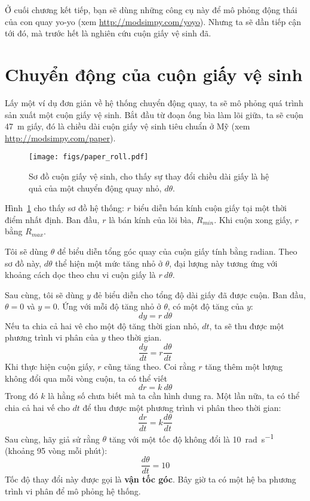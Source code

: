 \documentclass[12pt, openany]{book}
\theoremstyle{exercise}
\begin{document}
Ở cuối chương kết tiếp, bạn sẽ dùng những công cụ này để mô phỏng động thái của con quay yo-yo (xem \url{http://modsimpy.com/yoyo}).  Nhưng ta sẽ dần tiếp cận tới đó, mà trước hết là nghiên cứu cuộn giấy vệ sinh đã.



\section{Chuyển động của cuộn giấy vệ sinh}
\label{paper}


Lấy một ví dụ đơn giản về hệ thống chuyển động quay, ta sẽ mô phỏng quá trình sản xuất một cuộn giấy vệ sinh. Bắt đầu từ đoạn ống bìa làm lõi giữa, ta sẽ cuộn \SI{47}{\meter} giấy, đó là chiều dài cuộn giấy vệ sinh tiêu chuẩn ở Mỹ (xem \url{http://modsimpy.com/paper}).


\begin{figure}
\centerline{\texttt{[image: figs/paper\_roll.pdf]}}
\caption{Sơ đồ cuộn giấy vệ sinh, cho thấy sự thay đổi chiều dài giấy là hệ quả của một chuyển động quay nhỏ, $d\theta$.}
\label{paper_roll}
\end{figure}

Hình~\ref{paper_roll} cho thấy sơ đồ hệ thống: $r$ biểu diễn bán kính cuộn giấy tại một thời điểm nhất định. Ban đầu, $r$ là bán kính của lõi bìa, $R_{min}$.  Khi cuộn xong giấy, $r$ bằng $R_{max}$.

Tôi sẽ dùng $\theta$ để biểu diễn tổng góc quay của cuộn giấy tính bằng radian. Theo sơ đồ này, $d\theta$ thể hiện một mức tăng nhỏ ở $\theta$, đại lượng này tương ứng với khoảng cách dọc theo chu vi cuộn giấy là $r~d\theta$.


Sau cùng, tôi sẽ dùng $y$ đẻ biểu diễn cho tổng độ dài giấy đã được cuộn. Ban đầu, $\theta=0$ và $y=0$.  Ứng với mỗi độ tăng nhỏ ở $\theta$, có một độ tăng của $y$:
%
\[ dy = r~d\theta \]
%
Nếu ta chia cả hai vê cho một độ tăng thời gian nhỏ, $dt$, ta sẽ thu được một phương trình vi phân của $y$ theo thời gian.
%
\[ \frac{dy}{dt} = r \frac{d\theta}{dt} \]
%
Khi thực hiện cuộn giấy, $r$ cũng tăng theo. Coi rằng $r$ tăng thêm một lượng không đổi qua mỗi vòng cuộn, ta có thể viết 
%
\[ dr = k~d\theta \]
%
Trong đó $k$ là hằng số chưa biết mà ta cần hình dung ra. Một lần nữa, ta có thể chia cả hai vế cho $dt$ để thu được một phương trình vi phân theo thời gian:
%
\[ \frac{dr}{dt} = k \frac{d\theta}{dt} \]
%
Sau cùng, hãy giả sử rằng $\theta$ tăng với một tốc độ không đổi là \SI{10}{\radian\per\second} (khoảng 95 vòng mỗi phút):
%
\[ \frac{d\theta}{dt} = 10  \]
%
Tốc độ thay đổi này được gọi là {\bf vận tốc góc}.  Bây giờ ta có một hệ ba phương trình vi phân để mô phỏng hệ thống.
\end{document}
